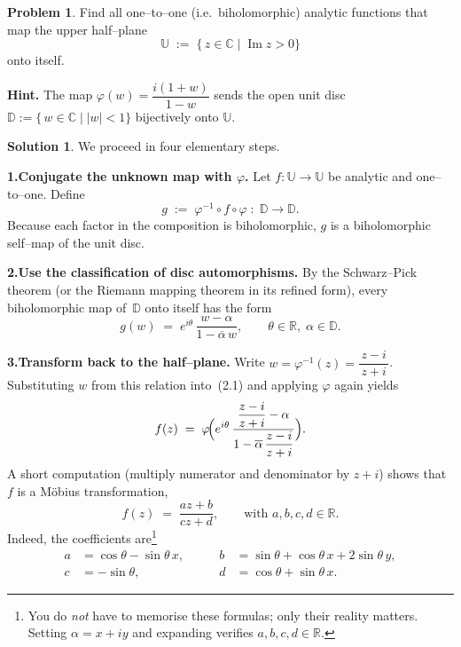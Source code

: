 \documentclass[12pt]{article}
\title{}
\author{Jerich Lee}
\date{\today}
\theoremstyle{definition} %
\newtheorem{solution}{Solution}
\newtheorem{problem}{Problem}
\theoremstyle{plain} %
\begin{document}
\maketitle
\begin{problem}
  Find all one–to–one (i.e.\ biholomorphic) analytic functions that map the
  upper half–plane
  \[
     \mathbb{U}\;:=\;\{\,z\in\mathbb{C}\mid\operatorname{Im}z>0\}
  \]
  onto itself.
  
  \medskip
  \noindent
  \textbf{Hint.}\;
  The map
  \(
     \varphi(w)=\dfrac{i(1+w)}{1-w}
  \)
  sends the open unit disc
  \(
     \mathbb{D}:=\{\,w\in\mathbb{C}\mid |w|<1\}
  \)
  bijectively onto $\mathbb{U}$.
  \end{problem}
  
  \begin{solution}
  We proceed in four elementary steps.
  
  \medskip
  \textbf{1.\;Conjugate the unknown map with $\varphi$.}
  Let \(f:\mathbb{U}\to\mathbb{U}\) be analytic and one–to–one.
  Define
  \[
     g \;:=\; \varphi^{-1}\circ f\circ\varphi
     \;:\;
     \mathbb{D}\longrightarrow\mathbb{D}.
  \]
  Because each factor in the composition is biholomorphic,  
  \(g\) is a biholomorphic self–map of the unit disc.
  
  \medskip
  \textbf{2.\;Use the classification of disc automorphisms.}
  By the Schwarz–Pick theorem (or the
  Riemann mapping theorem in its refined form),
  every biholomorphic map of~$\mathbb{D}$ onto itself has the form  
  \[
     g(w)
     \;=\;
     e^{i\theta}\,\frac{w-\alpha}{1-\overline{\alpha}\,w},
     \qquad
        \theta\in\mathbb{R},\;
        \alpha\in\mathbb{D}.
     \tag{2.1}
  \]
  
  \medskip
  \textbf{3.\;Transform back to the half–plane.}
  Write \(w=\varphi^{-1}(z)=\dfrac{z-i}{\,z+i\,}\).
  Substituting \(w\) from this relation into~(2.1) and applying \(\varphi\)
  again yields
  \[
     f(z)
     \;=\;
     \varphi\!\Bigl(
        e^{i\theta}\,
        \frac{\dfrac{z-i}{z+i}-\alpha}{1-\overline{\alpha}\,\dfrac{z-i}{z+i}}
     \Bigr).
  \]
  A short computation (multiply numerator and denominator by \(z+i\))
  shows that \(f\) is a Möbius transformation,
  \[
     f(z)
     \;=\;
     \frac{az+b}{cz+d},
     \qquad\text{with }a,b,c,d\in\mathbb{R}.
     \tag{3.1}
  \]
  Indeed,
  the coefficients are\footnote{You do \emph{not} have to memorise these
  formulas; only their reality matters.  Setting
  \(
     \alpha=x+iy
  \)
  and expanding verifies \(a,b,c,d\in\mathbb{R}\).}
  \[
  \begin{aligned}
     a &= \cos\theta-\sin\theta\,x, 
  &\qquad
     b &= \sin\theta+\cos\theta\,x+2\sin\theta\,y,\\
     c &= -\sin\theta, 
  &\qquad
     d &= \cos\theta+\sin\theta\,x .
  \end{aligned}
  \]
  

\end{solution}
\end{document}
